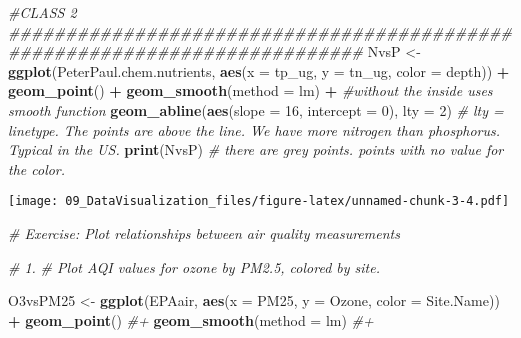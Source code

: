 \documentclass[]{article}
\newenvironment{Shaded}{\begin{snugshade}}{\end{snugshade}}
\newcommand{\KeywordTok}[1]{\textcolor[rgb]{0.13,0.29,0.53}{\textbf{#1}}}
\newcommand{\DataTypeTok}[1]{\textcolor[rgb]{0.13,0.29,0.53}{#1}}
\newcommand{\DecValTok}[1]{\textcolor[rgb]{0.00,0.00,0.81}{#1}}
\newcommand{\StringTok}[1]{\textcolor[rgb]{0.31,0.60,0.02}{#1}}
\newcommand{\CommentTok}[1]{\textcolor[rgb]{0.56,0.35,0.01}{\textit{#1}}}
\newcommand{\OperatorTok}[1]{\textcolor[rgb]{0.81,0.36,0.00}{\textbf{#1}}}
\newcommand{\NormalTok}[1]{#1}
\begin{document}
\begin{Shaded}
\begin{Highlighting}[]
\CommentTok{#CLASS 2 ###########################################################################}
\NormalTok{NvsP <-}
\StringTok{  }\KeywordTok{ggplot}\NormalTok{(PeterPaul.chem.nutrients, }\KeywordTok{aes}\NormalTok{(}\DataTypeTok{x =}\NormalTok{ tp_ug, }\DataTypeTok{y =}\NormalTok{ tn_ug, }\DataTypeTok{color =}\NormalTok{ depth)) }\OperatorTok{+}
\StringTok{  }\KeywordTok{geom_point}\NormalTok{() }\OperatorTok{+}
\StringTok{  }\KeywordTok{geom_smooth}\NormalTok{(}\DataTypeTok{method =}\NormalTok{ lm) }\OperatorTok{+}\StringTok{ }\CommentTok{#without the inside uses smooth function}
\StringTok{  }\KeywordTok{geom_abline}\NormalTok{(}\KeywordTok{aes}\NormalTok{(}\DataTypeTok{slope =} \DecValTok{16}\NormalTok{, }\DataTypeTok{intercept =} \DecValTok{0}\NormalTok{), }\DataTypeTok{lty =} \DecValTok{2}\NormalTok{) }\CommentTok{# lty = linetype. The points are above the line. We have more nitrogen than phosphorus. Typical in the US.}
\KeywordTok{print}\NormalTok{(NvsP)   }\CommentTok{# there are grey points. points with no value for the color.}
\end{Highlighting}
\end{Shaded}

\texttt{[image: 09\_DataVisualization\_files/figure-latex/unnamed-chunk-3-4.pdf]}

\begin{Shaded}
\begin{Highlighting}[]
\CommentTok{# Exercise: Plot relationships between air quality measurements}

\CommentTok{# 1. }
\CommentTok{# Plot AQI values for ozone by PM2.5, colored by site. }

\NormalTok{O3vsPM25 <-}
\StringTok{  }\KeywordTok{ggplot}\NormalTok{(EPAair, }\KeywordTok{aes}\NormalTok{(}\DataTypeTok{x =}\NormalTok{ PM25, }\DataTypeTok{y =}\NormalTok{ Ozone, }\DataTypeTok{color =}\NormalTok{ Site.Name)) }\OperatorTok{+}
\StringTok{  }\KeywordTok{geom_point}\NormalTok{() }\CommentTok{#+}
  \KeywordTok{geom_smooth}\NormalTok{(}\DataTypeTok{method =}\NormalTok{ lm) }\CommentTok{#+ }
\end{Highlighting}
\end{Shaded}
\end{document}
